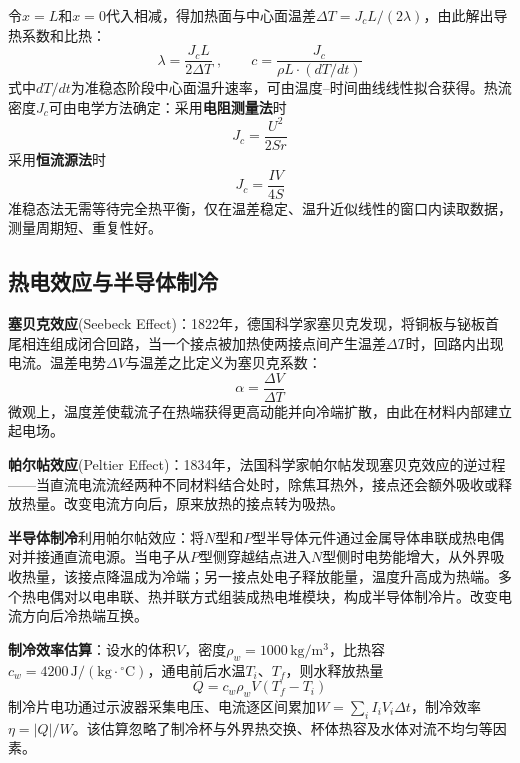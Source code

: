 \documentclass[UTF8]{article}
\begin{document}
令$x=L$和$x=0$代入相减，得加热面与中心面温差$\Delta T = J_c L/(2\lambda)$，由此解出导热系数和比热：
\begin{equation}\label{eq:lambda-quasi}
    \lambda = \frac{J_c L}{2\Delta T} \;,\qquad
    c = \frac{J_c}{\rho L \cdot (dT/dt)}
\end{equation}
式中$dT/dt$为准稳态阶段中心面温升速率，可由温度--时间曲线线性拟合获得。热流密度$J_c$可由电学方法确定：采用\textbf{电阻测量法}时
\begin{equation}\label{eq:Jc1}
    J_c = \frac{U^2}{2Sr}
\end{equation}
采用\textbf{恒流源法}时
\begin{equation}\label{eq:Jc2}
    J_c = \frac{IV}{4S}
\end{equation}
准稳态法无需等待完全热平衡，仅在温差稳定、温升近似线性的窗口内读取数据，测量周期短、重复性好。

\subsection{热电效应与半导体制冷}

\textbf{塞贝克效应}(Seebeck Effect)：1822年，德国科学家塞贝克发现，将铜板与铋板首尾相连组成闭合回路，当一个接点被加热使两接点间产生温差$\Delta T$时，回路内出现电流。温差电势$\Delta V$与温差之比定义为塞贝克系数：
\begin{equation}
    \alpha = \frac{\Delta V}{\Delta T}
\end{equation}
微观上，温度差使载流子在热端获得更高动能并向冷端扩散，由此在材料内部建立起电场。

\textbf{帕尔帖效应}(Peltier Effect)：1834年，法国科学家帕尔帖发现塞贝克效应的逆过程——当直流电流流经两种不同材料结合处时，除焦耳热外，接点还会额外吸收或释放热量。改变电流方向后，原来放热的接点转为吸热。

\textbf{半导体制冷}利用帕尔帖效应：将$N$型和$P$型半导体元件通过金属导体串联成热电偶对并接通直流电源。当电子从$P$型侧穿越结点进入$N$型侧时电势能增大，从外界吸收热量，该接点降温成为冷端；另一接点处电子释放能量，温度升高成为热端。多个热电偶对以电串联、热并联方式组装成热电堆模块，构成半导体制冷片。改变电流方向后冷热端互换。

\textbf{制冷效率估算}：设水的体积$V$，密度$\rho_w=1000\,\mathrm{kg/m^3}$，比热容$c_w=4200\,\mathrm{J/(kg\cdot{^{\circ}C})}$，通电前后水温$T_i$、$T_f$，则水释放热量
\begin{equation}
    Q = c_w \rho_w V(T_f - T_i)
\end{equation}
制冷片电功通过示波器采集电压、电流逐区间累加$W = \sum_i I_i V_i \Delta t$，制冷效率$\eta = |Q|/W$。该估算忽略了制冷杯与外界热交换、杯体热容及水体对流不均匀等因素。
\end{document}
